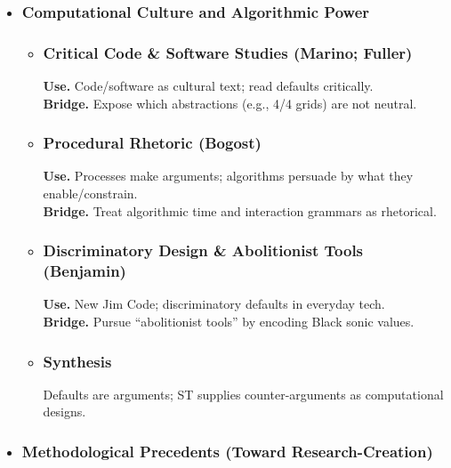 \begin{itemize}[nosep]
\begin{itemize}[nosep]
	\end{itemize}
	\item \subsubsection{Computational Culture and Algorithmic Power}
	\begin{itemize}[nosep]
		\item \subsubsection{Critical Code \& Software Studies (Marino; Fuller)}
		\textbf{Use.} Code/software as cultural text; read defaults critically. \\
		\textbf{Bridge.} Expose which abstractions (e.g., 4/4 grids) are not neutral.
		\item \subsubsection{Procedural Rhetoric (Bogost)}
		\textbf{Use.} Processes make arguments; algorithms persuade by what they enable/constrain. \\
		\textbf{Bridge.} Treat algorithmic time and interaction grammars as rhetorical.
		\item \subsubsection{Discriminatory Design \& Abolitionist Tools (Benjamin)}
		\textbf{Use.} New Jim Code; discriminatory defaults in everyday tech. \\
		\textbf{Bridge.} Pursue “abolitionist tools” by encoding Black sonic values.
		\item \subsubsection{Synthesis} Defaults are arguments; ST supplies counter-arguments as computational designs.
	\end{itemize}
	\item \subsubsection{Methodological Precedents (Toward Research-Creation)}
	\begin{itemize}[nosep]

\end{itemize}
\end{itemize}

